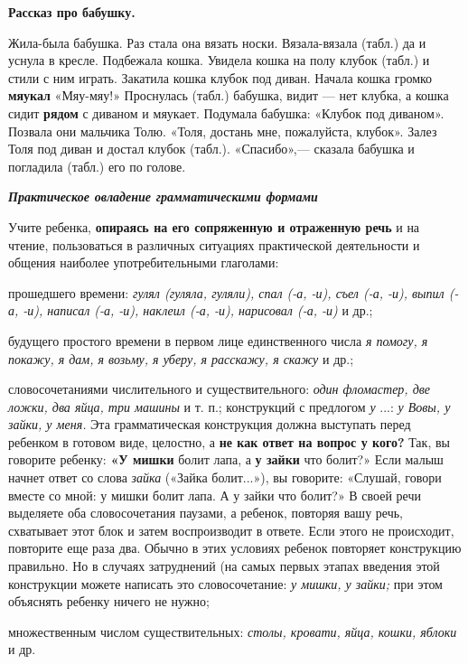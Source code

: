 \documentclass{book}
\renewcommand{\emph}[1]{\textit{#1}}
\begin{document}
\textbf{Рассказ про бабушку.}

Жила-была бабушка. Раз стала она вязать носки. Вязала-вязала (табл.) да
и уснула в кресле. Подбежала кошка. Увидела кошка на полу клубок (табл.)
и стили с ним играть. Закатила кошка клубок под диван. Начала кошка
громко \textbf{мяукал} «Мяу-мяу!» Проснулась (табл.) бабушка, видит ---
нет клубка, а кошка сидит \textbf{рядом} с диваном и мяукает. Подумала
бабушка: «Клубок под диваном». Позвала они мальчика Толю. «Толя, достань
мне, пожалуйста, клубок». Залез Толя под диван и достал клубок (табл.).
«Спасибо»,--- сказала бабушка и погладила (табл.) его по голове.

\emph{\textbf{Практическое овладение грамматическими формами}}

Учите ребенка, \textbf{опираясь на его сопряженную и отраженную речь} и
на чтение, пользоваться в различных ситуациях практической деятельности
и общения наиболее употребительными глаголами:

прошедшего времени: \emph{гулял (гуляла, гуляли), спал (-а, -и), съел
(-а, -и), выпил (-а, -и), написал (-а, -и), наклеил (-а, -и), нарисовал
(-а, -и)} и др.;

будущего простого времени в первом лице единственного числа \emph{я
помогу, я покажу, я дам, я возьму, я уберу, я расскажу, я скажу} и др.;

словосочетаниями числительного и существительного: \emph{один фломастер,
две ложки, два яйца, три машины} и т. п.; конструкций с предлогом
\emph{у} ...: \emph{у Вовы, у зайки, у меня.} Эта грамматическая
конструкция должна выступать перед ребенком в готовом виде, целостно, а
\textbf{не как ответ на вопрос у кого?} Так, вы говорите ребенку:
\textbf{«У мишки} болит лапа, а \textbf{у зайки} что болит?» Если малыш
начнет ответ со слова \emph{зайка} («Зайка болит...»), вы говорите:
«Слушай, говори вместе со мной: у мишки \textbar болит лапа. А у зайки
\textbar что болит?» В своей речи выделяете оба словосочетания паузами,
а ребенок, повторяя вашу речь, схватывает этот блок и затем
воспроизводит в ответе. Если этого не происходит, повторите еще раза
два. Обычно в этих условиях ребенок повторяет конструкцию правильно. Но
в случаях затруднений (на самых первых этапах введения этой конструкции
можете написать это словосочетание: \emph{у мишки, у зайки;} при этом
объяснять ребенку ничего не нужно;

множественным числом существительных: \emph{столы, кровати, яйца, кошки,
яблоки} и др.
\end{document}
